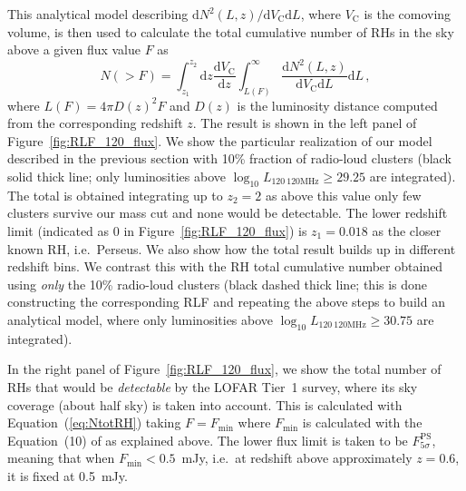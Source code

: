 \documentclass[traditabstract]{aa}
\newcommand{\rmn}{\mathrm}
\begin{document}
This analytical model describing $\rmn{d}N^2(L,z)/\rmn{d}V_{\rmn{C}}\rmn{d}L$, where $V_{\rmn{C}}$ is the comoving volume, is then used to calculate the total cumulative number of RHs in the sky above a given flux value $F$ as
%
\begin{equation}
N(>F)  =  \int_{z_1}^{z_2} \rmn{d}z \frac{\rmn{d}V_{\rmn{C}}}{\rmn{d}z} \int_{L(F)}^{\infty} \frac{\rmn{d}N^2(L,z)}{\rmn{d}V_{\rmn{C}}\rmn{d}L} \rmn{d}L \, ,
\label{eq:NtotRH}
\end{equation}
%
where $L(F) = 4 \pi D(z)^2 F$ and $D(z)$ is the luminosity distance computed from the corresponding redshift $z$.
The result is shown in the left panel of Figure~\ref{fig:RLF_120_flux}. We show the particular realization of our model described in the previous section with 10\% fraction of radio-loud clusters (black solid thick line; only luminosities above $\log_{10} L_{120~\rmn{120MHz}} \geq 29.25$ are integrated). The total is obtained integrating up to $z_{2} = 2$ as above this value only few clusters survive our mass cut and none would be detectable. The lower redshift limit (indicated as 0 in Figure~\ref{fig:RLF_120_flux}) is $z_{1} = 0.018$ as the closer known RH, i.e.~Perseus. We also show how the total result builds up in different redshift bins. We contrast this with the RH total cumulative number obtained using \emph{only} the 10\% radio-loud clusters (black dashed thick line; this is done constructing the corresponding RLF and repeating the above steps to build an analytical model, where only luminosities above $\log_{10} L_{120~\rmn{120MHz}} \geq 30.75$ are integrated). 

In the right panel of Figure~\ref{fig:RLF_120_flux}, we show the total number of RHs that would be \emph{detectable} by the LOFAR Tier~1 survey, where its sky coverage (about half sky) is taken into account. This is calculated with Equation~(\ref{eq:NtotRH}) taking $F = F_{\rmn{min}}$ where $F_{\rmn{min}}$ is calculated with the Equation~(10) of \cite{2010A&A...509A..68C} as explained above. The lower flux limit is taken to be $F_{5\sigma}^{\rmn{PS}}$, meaning that when $F_{\rmn{min}} < 0.5$~mJy, i.e.~at redshift above approximately $z = 0.6$, it is fixed at 0.5~mJy.  
\end{document}
